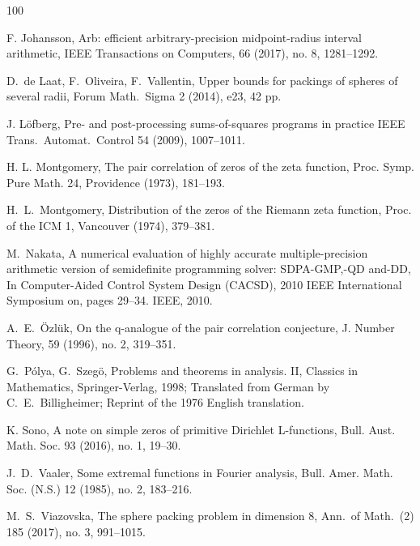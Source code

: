 \documentclass[reqno]{amsart}
\begin{document}
\begin{thebibliography}{100}
	
	F. Johansson,
	\newblock Arb: efficient arbitrary-precision midpoint-radius interval arithmetic,
	\newblock IEEE Transactions on Computers, 66 (2017), no. 8, 1281--1292.
	
	
	D.~de Laat, F.~Oliveira, F.~Vallentin,
	\newblock Upper bounds for packings of spheres of several radii,
	\newblock Forum Math.~Sigma 2 (2014), e23, 42 pp.
	
	
	
	J. L\"ofberg, 
	\newblock Pre- and post-processing sums-of-squares programs in practice
	\newblock IEEE Trans.~Automat.~Control 54 (2009), 1007–1011.
	
	
	H. L. Montgomery,
	\newblock The pair correlation of zeros of the zeta function, 
	\newblock Proc. Symp. Pure Math. 24, Providence (1973), 181--193.
	
	H.~L.~Montgomery,
	\newblock Distribution of the zeros of the Riemann zeta function, 
	\newblock Proc. of the ICM 1, Vancouver (1974), 379--381.
	
	M.~Nakata,
	\newblock A numerical evaluation of highly accurate multiple-precision arithmetic version of semidefinite programming solver: SDPA-GMP,-QD and-DD,
	\newblock In Computer-Aided Control System Design (CACSD), 2010 IEEE International Symposium on, pages 29–34. IEEE, 2010.
	
	A.~E.~\"{O}zl\"{u}k,
	\newblock On the q-analogue of the pair correlation conjecture, 
	\newblock J. Number Theory, 59 (1996), no. 2, 319--351.
	
		
	G.~P\'olya, G.~Szeg\"o, 
	\newblock Problems and theorems in analysis. II,
	\newblock Classics in Mathematics, Springer-Verlag, 1998; Translated from German by C.~E.~Billigheimer; Reprint of the 1976 English translation.
	
	
	K. Sono, 
	\newblock A note on simple zeros of primitive Dirichlet L-functions, 
	\newblock Bull. Aust. Math. Soc. 93 (2016), no. 1, 19--30.
	
	
	
	J.~D.~Vaaler,
	\newblock Some extremal functions in Fourier analysis,
	\newblock Bull. Amer. Math. Soc. (N.S.) 12 (1985), no. 2, 183--216.
	
	
	 M.~S.~Viazovska, 
	\newblock The sphere packing problem in dimension $8$,
	\newblock Ann.\ of Math.\ (2) {185} (2017), no. 3, 991--1015. 
	
	
\end{thebibliography}
\end{document}
